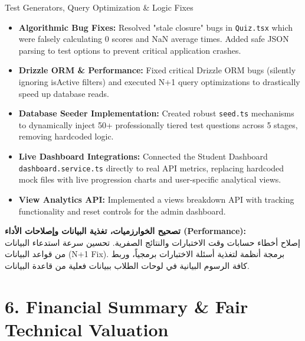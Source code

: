 \documentclass[11pt,a4paper]{article}
\begin{document}
\begin{topicbox}{Test Generators, Query Optimization \& Logic Fixes}
\begin{itemize}[leftmargin=*]
\item \textbf{Algorithmic Bug Fixes:} Resolved "stale closure" bugs in \texttt{Quiz.tsx} which were falsely calculating 0 scores and NaN average times. Added safe JSON parsing to test options to prevent critical application crashes.
\item \textbf{Drizzle ORM \& Performance:} Fixed critical Drizzle ORM bugs (silently ignoring isActive filters) and executed N+1 query optimizations to drastically speed up database reads.
\item \textbf{Database Seeder Implementation:} Created robust \texttt{seed.ts} mechanisms to dynamically inject 50+ professionally tiered test questions across 5 stages, removing hardcoded logic.
\item \textbf{Live Dashboard Integrations:} Connected the Student Dashboard \texttt{dashboard.service.ts} directly to real API metrics, replacing hardcoded mock files with live progression charts and user-specific analytical views.
\item \textbf{View Analytics API:} Implemented a views breakdown API with tracking functionality and reset controls for the admin dashboard.
\end{itemize}
\end{topicbox}
\begin{arabicbox}
\textbf{\textarabic{تصحيح الخوارزميات، تغذية البيانات وإصلاحات الأداء (Performance):}}\\
\textarabic{إصلاح أخطاء حسابات وقت الاختبارات والنتائج الصفرية. تحسين سرعة استدعاء البيانات من قواعد البيانات} (\textenglish{N+1 Fix})\textarabic{. برمجة أنظمة لتغذية أسئلة الاختبارات برمجياً، وربط كافة الرسوم البيانية في لوحات الطلاب ببيانات فعلية من قاعدة البيانات.}
\end{arabicbox}

\section{6. Financial Summary \& Fair Technical Valuation}
\end{document}
